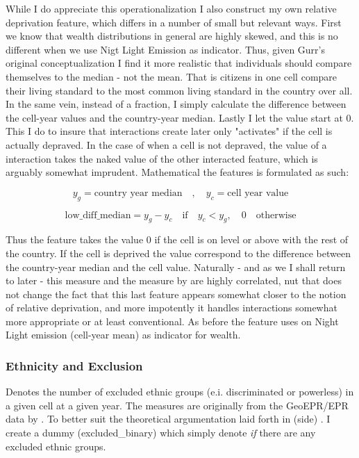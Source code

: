 \documentclass[a4paper]{article}
\begin{document}
While I do appreciate this operationalization I also construct my own relative deprivation feature, which differs in a number of small but relevant ways. First we know that wealth distributions in general are highly skewed, and this is no different when we use Nigt Light Emission as indicator. Thus, given Gurr's original conceptualization I find it more realistic that individuals should compare themselves to the median - not the mean. That is citizens in one cell compare their living standard to the most common living standard in the country over all. In the same vein, instead of a fraction, I simply calculate the difference between the cell-year values and the country-year median. Lastly I let the value start at 0. This I do to insure that interactions create later only "activates" if the cell is actually depraved. In the case of \cite{Cederman_Gleditsch_Buhaug_2013} when a cell is not depraved, the value of a interaction takes the naked value of the other interacted feature, which is arguably somewhat imprudent. Mathematical the features is formulated as such:\par

$$y_g = \textrm{country year median}\quad ,\quad  y_c = \textrm{cell year value}$$

$$\textrm{low\_diff\_median} = y_g - y_c  \quad \textrm{if} \quad y_c < y_g, \quad 0 \quad \textrm{otherwise}$$

Thus the feature takes the value 0 if the cell is on level or above with the rest of the country. If the cell is deprived the value correspond to the difference between the country-year median and the cell value. Naturally - and as we I shall return to later - this measure and the measure by \cite{Cederman_Weidmann_Gleditsch_2011} are highly correlated, nut that does not change the fact that this last feature appears somewhat closer to the notion of relative deprivation, and more impotently it handles interactions somewhat more appropriate or at least conventional. As before the feature uses on Night Light emission (cell-year mean) as indicator for wealth.\par

\subsubsection{Ethnicity and Exclusion}

Denotes the number of excluded ethnic groups (e.i. discriminated or powerless) in a given cell at a given year. The measures are originally from the GeoEPR/EPR data by \cite{Vogt_2015}. To better suit the theoretical argumentation laid forth in \cite{Cederman_Gleditsch_Buhaug_2013}(side) \citep{prio_code_2015}. I create a dummy (excluded\_binary) which simply denote \emph{if} there are any excluded ethnic groups. 
\end{document}
